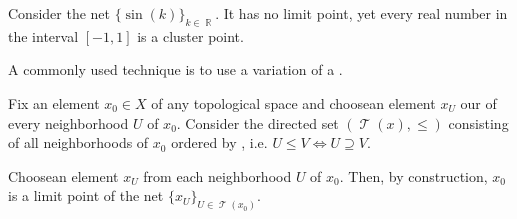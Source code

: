 \begin{example}\label{ex:cluster_points/sine}
  Consider the net \( \{ \sin(k) \}_{k \in \BbbR} \). It has no limit point, yet every real number in the interval \( [-1, 1] \) is a cluster point.
\end{example}

\begin{example}\label{ex:reverse_inclusion_net}
  A commonly used technique is to use a variation of a .

  Fix an element \( x_0 \in X \) of any topological space and choose\LEM an element \( x_U \) our of every neighborhood \( U \) of \( x_0 \). Consider the directed set \( (\mscrT(x), \leq) \) consisting of all neighborhoods of \( x_0 \) ordered by , i.e. \( U \leq V \iff U \supseteq V \).

  Choose\LEM an element \( x_U \) from each neighborhood \( U \) of \( x_0 \). Then, by construction, \( x_0 \) is a limit point of the net \( \{ x_U \}_{U \in \mscrT(x_0)} \).
\end{example}

